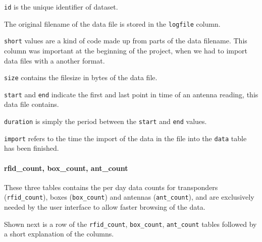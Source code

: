 \begin{mydesc}
	\item \lstinline|id| is the unique identifier of dataset.
	\item The original filename of the data file is stored in the \lstinline|logfile| column.
	\item \lstinline|short| values are a kind of code made up from parts of the data filename. This column was important at the beginning of the project, when we had to import data files with a another format.
	\item \lstinline|size| contains the filesize in bytes of the data file.
	\item \lstinline|start| and \lstinline|end| indicate the first and last point in time of an antenna reading, this data file contains.
	\item \lstinline|duration| is simply the period between the \lstinline|start| and \lstinline|end| values.
	\item \lstinline|import| refers to the time the import of the data in the file into the \lstinline|data| table has been finished.
\end{mydesc}

\paragraph{rfid\_count, box\_count, ant\_count}
\label{para:counts}

These three tables contains the per day data counts for transponders (\lstinline|rfid_count|), boxes (\lstinline|box_count|) and antennas (\lstinline|ant_count|), and are exclusively needed by the user interface to allow faster browsing of the data.

Shown next is a row of the \lstinline|rfid_count|, \lstinline|box_count|, \lstinline|ant_count| tables followed by a short explanation of the columns.

